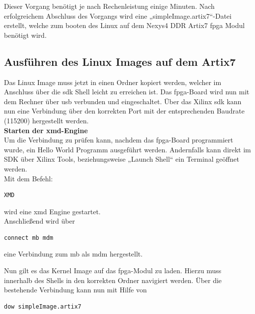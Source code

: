 Dieser Vorgang benötigt je nach Rechenleistung einige Minuten.
Nach erfolgreichem Abschluss des Vorgangs wird eine „simpleImage.artix7“-Datei erstellt,
welche zum booten des Linux auf dem Nexys4 DDR Artix7 \ac{fpga} Modul benötigt wird.

\subsection{Ausführen des Linux Images auf dem Artix7}\label{kap:mcausführenlinux}



Das Linux Image muss jetzt in einen Ordner kopiert werden, welcher im Anschluss über
die \ac{sdk} Shell leicht zu erreichen ist. Das \ac{fpga}-Board wird nun mit dem Rechner über \ac{usb} verbunden und eingeschaltet.
 Über das Xilinx \ac{sdk} kann nun eine Verbindung über den korrekten Port mit der entsprechenden Baudrate (115200)
 hergestellt werden.\\

\textbf{Starten der \ac{xmd}-Engine}\\

Um die Verbindung zu prüfen kann, nachdem das \ac{fpga}-Board programmiert wurde, ein Hello World Programm ausgeführt werden. Andernfalls kann direkt im SDK über Xilinx Tools, beziehungsweise  „Launch Shell“ ein Terminal geöffnet werden.\\

Mit dem Befehl:

\begin{lstlisting}[caption={Öffnen des \ac{xmd}},label={code:mbxmd}]
  XMD
   \end{lstlisting}


wird eine \ac{xmd} Engine gestartet.\\

Anschließend wird über\\
\begin{lstlisting}[caption={Herstellen der Verbindung zum \acl{mb}},label={code:mbtarget}]
connect mb mdm
   \end{lstlisting}

eine Verbindung zum \ac{mb} als \ac{mdm} hergestellt.

Nun gilt es das Kernel Image auf das \ac{fpga}-Modul zu laden.
Hierzu muss innerhalb des Shells in den korrekten Ordner navigiert werden.
Über die bestehende Verbindung kann nun mit Hilfe von
\begin{lstlisting}[caption={Download des Images},label={code:mbimage}]
  dow simpleImage.artix7
   \end{lstlisting}

